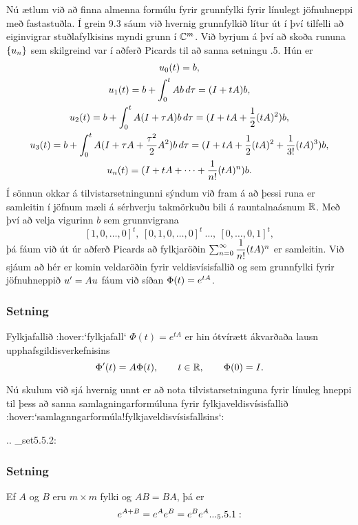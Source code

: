 \noindent
Nú ætlum við að finna almenna formúlu fyrir grunnfylki fyrir línulegt
jöfnuhneppi með fastastuðla.  Í grein 9.3 sáum við hvernig
grunnfylkið lítur út í því tilfelli að eiginvigrar stuðlafylkisins
myndi grunn í ${\mathbb C}\sp m$.  Við byrjum á því að skoða rununa ${\{u_n\}}$ sem skilgreind var í aðferð Picards til að sanna setningu
.5.  Hún er 
\begin{gather*}
u_0(t)=b,\\
u_1(t)=b+\int_0\sp t Ab \, d\tau = (I+tA)b,\\
u_2(t)=b+\int_0\sp t A(I+\tau A)b \, d\tau = (I+tA+\dfrac 12(tA)\sp 2)b,\\
u_3(t)=b+\int_0\sp t A(I+\tau A + \dfrac{\tau\sp 2}2A\sp 2)b \, d\tau 
= (I+tA+\dfrac 12(tA)\sp 2+\dfrac 1{3!}(tA)\sp 3)b,\\
u_n(t)= (I+tA+\dots+\dfrac 1{n!}(tA)\sp n)b.
\end{gather*}
Í sönnun okkar á tilvistarsetningunni sýndum við fram á að þessi runa
er samleitin í jöfnum mæli á sérhverju takmörkuðu bili á
rauntalnaásnum ${\mathbb R}$.
Með því að velja vigurinn $b$ sem grunnvigrana 
$$[1,0,\dots,0]^t, \ [0,1,0,\dots,0]^t\ \dots, 
\ [0,\dots,0,1]^t,$$ 
þá fáum við út úr aðferð Picards að fylkjaröðin
$\sum_{n=0}\sp \infty 
\dfrac 1{n!}(tA)\sp n$ er samleitin.  Við sjáum að hér er komin
veldaröðin fyrir veldisvísisfallið og sem grunnfylki fyrir
jöfnuhneppið $u{\sp{\prime}}=Au$ fáum við síðan $\Phi(t)=e\sp {tA}$.  

\subsubsection{Setning}
Fylkjafallið :hover:`fylkjafall` $\Phi(t)= e^{tA}$ er hin ótvírætt ákvarðaða lausn
upphafsgildisverkefnisins
 $$\Phi{\sp{\prime}}(t) = A\Phi(t), \qquad t\in {\mathbb R}, \qquad \Phi(0)=I.
 $$
 

\medskip
Nú skulum við sjá hvernig unnt er að nota tilvistarsetninguna fyrir
línuleg hneppi til þess að sanna samlagningarformúluna fyrir
fylkja\-veldis\-vísis\-fallið
 :hover:`samlagnngarformúla!fylkjaveldisvísisfallsins`: 


.. _set5.5.2:

\subsubsection{Setning}
Ef $A$ og $B$ eru $m\times m$ fylki og $AB=BA$, þá er
 \begin{equation*}e\sp{A+B}=e\sp Ae\sp B=e^Be^A.

.. _5.5.1:

 \end{equation*}


